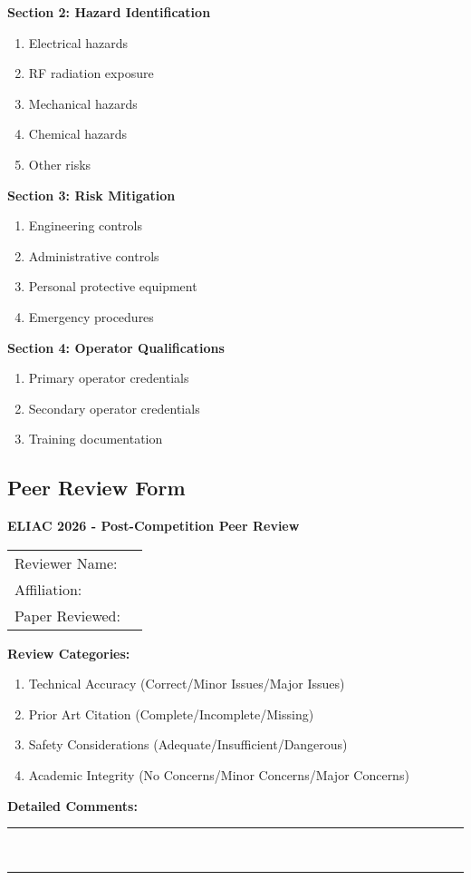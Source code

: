 \noindent\textbf{Section 2: Hazard Identification}
\begin{enumerate}[noitemsep]
    \item Electrical hazards
    \item RF radiation exposure
    \item Mechanical hazards
    \item Chemical hazards
    \item Other risks
\end{enumerate}

\noindent\textbf{Section 3: Risk Mitigation}
\begin{enumerate}[noitemsep]
    \item Engineering controls
    \item Administrative controls
    \item Personal protective equipment
    \item Emergency procedures
\end{enumerate}

\noindent\textbf{Section 4: Operator Qualifications}
\begin{enumerate}[noitemsep]
    \item Primary operator credentials
    \item Secondary operator credentials
    \item Training documentation
\end{enumerate}

\subsection{Peer Review Form}

\noindent\textbf{ELIAC 2026 - Post-Competition Peer Review}

\vspace{1em}
\begin{tabular}{ll}
Reviewer Name: & \underline{\hspace{8cm}} \\[0.5em]
Affiliation: & \underline{\hspace{8cm}} \\[0.5em]
Paper Reviewed: & \underline{\hspace{8cm}} \\[0.5em]
\end{tabular}

\vspace{1em}
\noindent\textbf{Review Categories:}
\begin{enumerate}[noitemsep]
    \item Technical Accuracy (Correct/Minor Issues/Major Issues)
    \item Prior Art Citation (Complete/Incomplete/Missing)
    \item Safety Considerations (Adequate/Insufficient/Dangerous)
    \item Academic Integrity (No Concerns/Minor Concerns/Major Concerns)
\end{enumerate}

\noindent\textbf{Detailed Comments:}\\
\noindent\rule{\textwidth}{0.5pt}\\
\noindent\rule{\textwidth}{0.5pt}